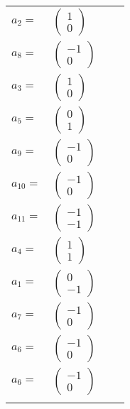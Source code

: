 \documentclass[1p]{elsarticle_modified}
\theoremstyle{definition}
\begin{document}
\begin{tabular}{m{7pt} m{180pt} m{7pt} m{180pt} }
\flushright $a_{2}=$&$\begin{pmatrix}1\\0\end{pmatrix}$ \\
\flushright $a_{8}=$&$\begin{pmatrix}-1\\0\end{pmatrix}$ \\
\flushright $a_{3}=$&$\begin{pmatrix}1\\0\end{pmatrix}$ \\
\flushright $a_{5}=$&$\begin{pmatrix}0\\1\end{pmatrix}$ \\
\flushright $a_{9}=$&$\begin{pmatrix}-1\\0\end{pmatrix}$ \\
\flushright $a_{10}=$&$\begin{pmatrix}-1\\0\end{pmatrix}$ \\
\flushright $a_{11}=$&$\begin{pmatrix}-1\\-1\end{pmatrix}$ \\
\flushright $a_{4}=$&$\begin{pmatrix}1\\1\end{pmatrix}$ \\
\flushright $a_{1}=$&$\begin{pmatrix}0\\-1\end{pmatrix}$ \\
\flushright $a_{7}=$&$\begin{pmatrix}-1\\0\end{pmatrix}$ \\
\flushright $a_{6}=$&$\begin{pmatrix}-1\\0\end{pmatrix}$\\ \flushright $a_{6}=$&$\begin{pmatrix}-1\\0\end{pmatrix}$\\&\end{tabular}
\end{document}
